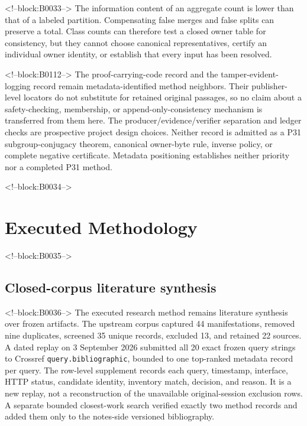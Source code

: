\documentclass[11pt]{article}
\begin{document}
<!--block:B0033-->
The information content of an aggregate count is lower than that of a
labeled partition. Compensating false merges and false splits can
preserve a total. Class counts can therefore test a closed owner table
for consistency, but they cannot choose canonical representatives,
certify an individual owner identity, or establish that every input has
been resolved.

<!--block:B0112-->
The proof-carrying-code record \citep{P31-S23} and the tamper-evident-logging
record \citep{P31-S24} remain metadata-identified method neighbors. Their
publisher-level locators do not substitute for retained original passages, so
no claim about a safety-checking, membership, or append-only-consistency
mechanism is transferred from them here. The producer/evidence/verifier
separation and ledger checks are prospective project design choices. Neither
record is admitted as a P31 subgroup-conjugacy theorem, canonical owner-byte
rule, inverse policy, or complete negative certificate. Metadata positioning
establishes neither priority nor a completed P31 method.

<!--block:B0034-->
\hypertarget{3-executed-methodology}{%
\section{Executed Methodology}\label{3-executed-methodology}}

<!--block:B0035-->
\hypertarget{31-closed-corpus-literature-synthesis}{%
\subsection{Closed-corpus literature
synthesis}\label{31-closed-corpus-literature-synthesis}}

<!--block:B0036-->
The executed research method remains literature synthesis over frozen artifacts.
The upstream corpus captured 44 manifestations, removed nine duplicates, screened
35 unique records, excluded 13, and retained 22 sources.  A dated replay on
3 September 2026 submitted all 20 exact frozen query strings to Crossref
\texttt{query.bibliographic}, bounded to one top-ranked metadata record per query.
The row-level supplement records each query, timestamp, interface, HTTP status,
candidate identity, inventory match, decision, and reason.  It is a new replay,
not a reconstruction of the unavailable original-session exclusion rows.  A
separate bounded closest-work search verified exactly two method records and
added them only to the notes-side versioned bibliography.
\end{document}
